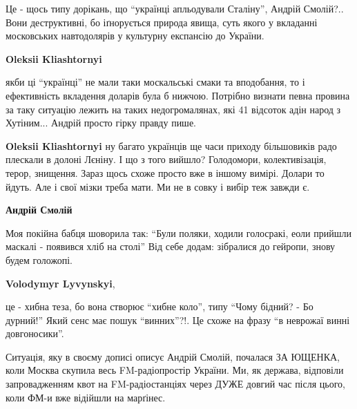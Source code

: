  
 
 
 
 
\zzSecCmt

\begin{itemize} %

Це - щось типу дорікань, що \enquote{українці апльодували Сталіну}, Андрій Смолій?..
Вони деструктивні, бо іґнорується природа явища, суть якого у вкладанні
московських навтодолярів у культурну експансію до України.

\begin{itemize} %
\textbf{Oleksii Kliashtornyi} 

якби ці \enquote{українці} не мали таки москальські смаки та вподобання, то і
ефективність вкладення доларів була б нижчою. Потрібно визнати певна провина за
таку ситуацію лежить на таких недогромалянах, які 41 відсоток адін народ з
Хутіним... Андрій просто гірку правду пише.

\textbf{Oleksii Kliashtornyi} ну багато українців ще часи приходу більшовиків радо плескали в долоні Лєніну.
І що з того вийшло? Голодомори, колективізація, терор, знищення.
Зараз щось схоже просто вже в іншому вимірі.
Долари то йдуть. Але і свої мізки треба мати. Ми не в совку і вибір теж завжди є.

\textbf{Андрій Смолій} 

Моя покійна бабця шоворила так: \enquote{Були поляки, ходили голосракі, еоли прийшли
маскалі - появився хліб на столі} Від себе додам: зібралися до гейропи, знову
будем голожопі.

\textbf{Volodymyr Lyvynskyi}, 

це - хибна теза, бо вона створює \enquote{хибне коло}, типу \enquote{Чому бідний? - Бо дурний!}
Який сенс має пошук \enquote{винних}?!. Це схоже на фразу \enquote{в неврожаї винні
довгоносики}.

Ситуація, яку в своєму дописі описує Андрій Смолій, почалася ЗА ЮЩЕНКА, коли
Москва скупила весь FM-радіопростір України. Ми, як держава, відповіли
запровадженням квот на FM-радіостанціях через ДУЖЕ довгий час після цього, коли
ФМ-и вже відійшли на марґінес.


\end{itemize}
\end{itemize}
